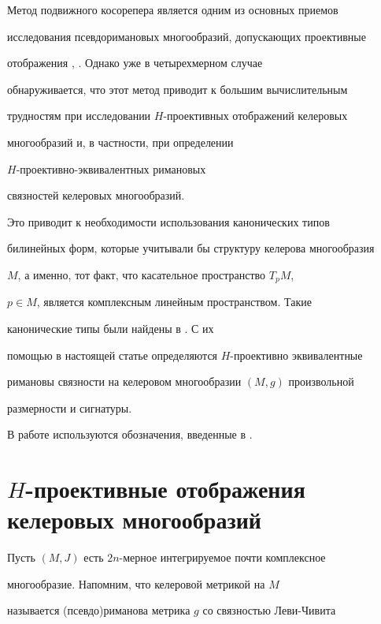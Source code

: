Метод подвижного косорепера является одним из основных приемов


исследования псевдоримановых многообразий, допускающих проективные


отображения \cite{am1}, \cite{am-dop}. Однако уже в четырехмерном случае


обнаруживается, что этот метод приводит к большим вычислительным


трудностям при исследовании $H$-проективных отображений келеровых


многообразий и, в частности, при определении


$H$-проективно-эквивалентных римановых


связностей келеровых многообразий.





Это приводит к необходимости использования канонических типов


билинейных форм, которые учитывали бы структуру келерова многообразия


$M$, а именно, тот факт, что касательное пространство $T_p M$,


$p\in M$, является комплексным линейным пространством. Такие


канонические типы были найдены в \cite{kanew}. С их


помощью в настоящей статье определяются $H$-проективно эквивалентные


римановы связности на келеровом многообразии $(M,g)$ произвольной


размерности и сигнатуры.





В работе используются обозначения, введенные в \cite{kanew}.





\section{$H$-проективные отображения келеровых многообразий}





Пусть $(M,J)$ есть $2n$-мерное интегрируемое почти комплексное


многообразие. Напомним, что келеровой метрикой на $M$


называется (псевдо)риманова метрика $g$ со связностью Леви-Чивита


